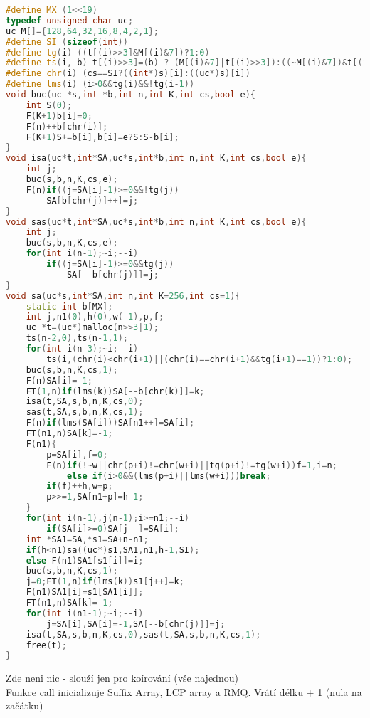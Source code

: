 \documentclass[11pt]{article}
\begin{document}
\begin{lstlisting}[language=C++]
#define MX (1<<19)
typedef unsigned char uc;	
uc M[]={128,64,32,16,8,4,2,1};
#define SI (sizeof(int))
#define tg(i) ((t[(i)>>3]&M[(i)&7])?1:0)
#define ts(i, b) t[(i)>>3]=(b) ? (M[(i)&7]|t[(i)>>3]):((~M[(i)&7])&t[(i)>>3])
#define chr(i) (cs==SI?((int*)s)[i]:((uc*)s)[i])
#define lms(i) (i>0&&tg(i)&&!tg(i-1))
void buc(uc *s,int *b,int n,int K,int cs,bool e){
    int S(0);
    F(K+1)b[i]=0;
    F(n)++b[chr(i)];
    F(K+1)S+=b[i],b[i]=e?S:S-b[i];
}
void isa(uc*t,int*SA,uc*s,int*b,int n,int K,int cs,bool e){
    int j;
    buc(s,b,n,K,cs,e);
    F(n)if((j=SA[i]-1)>=0&&!tg(j))
        SA[b[chr(j)]++]=j;
}
void sas(uc*t,int*SA,uc*s,int*b,int n,int K,int cs,bool e){
    int j;
    buc(s,b,n,K,cs,e);
    for(int i(n-1);~i;--i)
        if((j=SA[i]-1)>=0&&tg(j))
            SA[--b[chr(j)]]=j;
}
void sa(uc*s,int*SA,int n,int K=256,int cs=1){
    static int b[MX];
    int j,n1(0),h(0),w(-1),p,f;
    uc *t=(uc*)malloc(n>>3|1);
    ts(n-2,0),ts(n-1,1);
    for(int i(n-3);~i;--i)
        ts(i,(chr(i)<chr(i+1)||(chr(i)==chr(i+1)&&tg(i+1)==1))?1:0);
    buc(s,b,n,K,cs,1);
    F(n)SA[i]=-1;
    FT(1,n)if(lms(k))SA[--b[chr(k)]]=k;
    isa(t,SA,s,b,n,K,cs,0);
    sas(t,SA,s,b,n,K,cs,1);
    F(n)if(lms(SA[i]))SA[n1++]=SA[i];
    FT(n1,n)SA[k]=-1;
    F(n1){
        p=SA[i],f=0;
        F(n)if(!~w||chr(p+i)!=chr(w+i)||tg(p+i)!=tg(w+i))f=1,i=n;
            else if(i>0&&(lms(p+i)||lms(w+i)))break;
        if(f)++h,w=p;
        p>>=1,SA[n1+p]=h-1;
    }
    for(int i(n-1),j(n-1);i>=n1;--i)
        if(SA[i]>=0)SA[j--]=SA[i];
    int *SA1=SA,*s1=SA+n-n1;
    if(h<n1)sa((uc*)s1,SA1,n1,h-1,SI);
    else F(n1)SA1[s1[i]]=i;
    buc(s,b,n,K,cs,1);
    j=0;FT(1,n)if(lms(k))s1[j++]=k;
    F(n1)SA1[i]=s1[SA1[i]];
    FT(n1,n)SA[k]=-1;
    for(int i(n1-1);~i;--i)
        j=SA[i],SA[i]=-1,SA[--b[chr(j)]]=j;
    isa(t,SA,s,b,n,K,cs,0),sas(t,SA,s,b,n,K,cs,1);
    free(t);
}
\end{lstlisting}
Zde neni nic - slouží jen pro koírování (vše najednou)
\\Funkce call inicializuje Suffix Array, LCP array a RMQ. Vrátí délku + 1 (nula na začátku)
\end{document}
